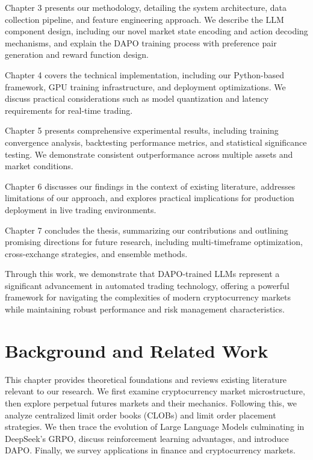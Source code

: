 \documentclass{report}
\begin{document}
Chapter 3 presents our methodology, detailing the system architecture, data collection pipeline, and feature engineering approach. We describe the LLM component design, including our novel market state encoding and action decoding mechanisms, and explain the DAPO training process with preference pair generation and reward function design.

Chapter 4 covers the technical implementation, including our Python-based framework, GPU training infrastructure, and deployment optimizations. We discuss practical considerations such as model quantization and latency requirements for real-time trading.

Chapter 5 presents comprehensive experimental results, including training convergence analysis, backtesting performance metrics, and statistical significance testing. We demonstrate consistent outperformance across multiple assets and market conditions.

Chapter 6 discusses our findings in the context of existing literature, addresses limitations of our approach, and explores practical implications for production deployment in live trading environments.

Chapter 7 concludes the thesis, summarizing our contributions and outlining promising directions for future research, including multi-timeframe optimization, cross-exchange strategies, and ensemble methods.

Through this work, we demonstrate that DAPO-trained LLMs represent a significant advancement in automated trading technology, offering a powerful framework for navigating the complexities of modern cryptocurrency markets while maintaining robust performance and risk management characteristics.   

\chapter{Background and Related Work}

This chapter provides theoretical foundations and reviews existing literature relevant to our research. We first examine cryptocurrency market microstructure, then explore perpetual futures markets and their mechanics. Following this, we analyze centralized limit order books (CLOBs) and limit order placement strategies. We then trace the evolution of Large Language Models culminating in DeepSeek's GRPO, discuss reinforcement learning advantages, and introduce DAPO. Finally, we survey applications in finance and cryptocurrency markets.
\end{document}
